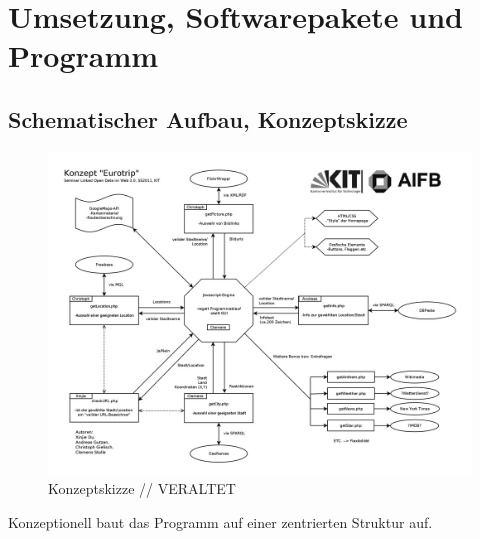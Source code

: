 \documentclass[a4paper, 11pt]{article}
\begin{document}
\section{Umsetzung, Softwarepakete und Programm}
\subsection{Schematischer Aufbau, Konzeptskizze}
\begin{figure}[H]
	\centering
	\includegraphics[width=0.5\columnwidth, angle=0]{seminarLOD.png}
	\caption{Konzeptskizze // VERALTET}
	\label{img:grafik-dummy}
\end{figure}
Konzeptionell baut das Programm auf einer zentrierten Struktur auf.
\end{document}
